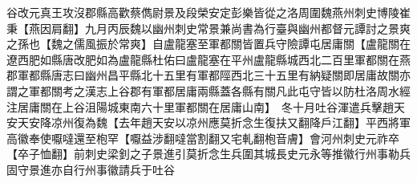 谷改元真王攻沒郡縣高歡蔡儁尉景及段榮安定彭樂皆從之洛周圍魏燕州刺史博陵崔秉【燕因肩翻】九月丙辰魏以幽州刺史常景兼尚書為行臺與幽州都督元譚討之景爽之孫也【魏之儒風振於常爽】自盧龍塞至軍都關皆置兵守險譚屯居庸關【盧龍關在遼西肥如縣唐改肥如為盧龍縣杜佑曰盧龍塞在平州盧龍縣城西北二百里軍都關在燕郡軍都縣唐志曰幽州昌平縣北十五里有軍都陘西北三十五里有納疑關即居庸故關亦謂之軍都關考之漢志上谷郡有軍都居庸兩縣蓋各縣有關凡此屯守皆以防杜洛周水經注居庸關在上谷沮陽城東南六十里軍都關在居庸山南】　冬十月吐谷渾遣兵擊趙天安天安降凉州復為魏【去年趙天安以凉州應莫折念生復扶又翻降戶江翻】平西將軍高徽奉使嚈噠還至枹罕【嚈益涉翻噠當割翻又宅軋翻枹音膚】會河州刺史元祚卒【卒子恤翻】前刺史梁釗之子景進引莫折念生兵圍其城長史元永等推徽行州事勒兵固守景進亦自行州事徽請兵于吐谷
